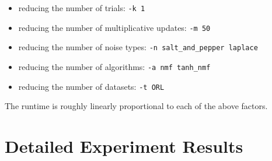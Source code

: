 \documentclass{article} %
\begin{document}
\begin{itemize}
\item reducing the number of trials: \texttt{-k 1}
\item reducing the number of multiplicative updates: \texttt{-m 50}
\item reducing the number of noise types: \texttt{-n salt\_and\_pepper laplace}
\item reducing the number of algorithms: \texttt{-a nmf tanh\_nmf}
\item reducing the number of datasets: \texttt{-t ORL}
\end{itemize}

The runtime is roughly linearly proportional to each of the above factors.

\section{Detailed Experiment Results}
\end{document}
